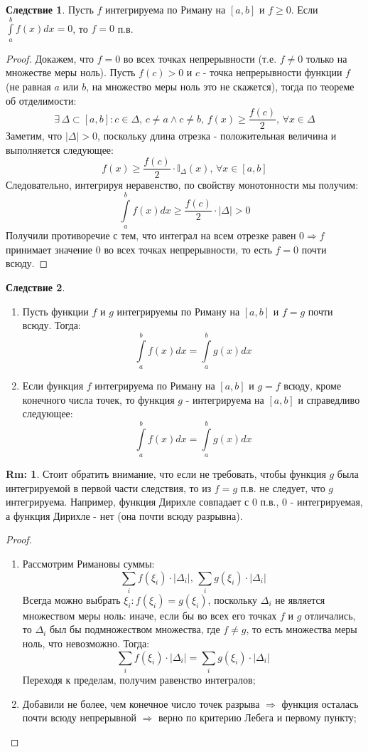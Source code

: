\documentclass[12pt]{article}
\theoremstyle{definition}
\newtheorem{rem}{Rm:}
\newtheorem{corollary}{Следствие}
\newcommand{\ddint}[2]{\displaystyle\int\limits_{#1}^{#2}}
\begin{document}
\begin{corollary}
	Пусть $f$ интегрируема по Риману на $[a,b]$ и $f \geq 0$. Если $\ddint{a}{b}f(x)dx = 0$, то $f =0$ п.в.
\end{corollary}
\begin{proof}
	Докажем, что $f = 0$ во всех точках непрерывности (т.е. $f \neq 0$ только на множестве меры ноль). Пусть $f(c) > 0$ и $c$ - точка непрерывности функции $f$ (не равная $a$ или $b$, на множество меры ноль это не скажется), тогда по теореме об отделимости:
	$$
		\exists \, \Delta \subset [a,b] \colon c \in \Delta,\, c \neq a \wedge c \neq b, \, f(x) \geq \dfrac{f(c)}{2}, \, \forall x \in \Delta
	$$
	Заметим, что $|\Delta| > 0$, поскольку длина отрезка - положительная величина и выполняется следующее:
	$$
		f(x) \geq \dfrac{f(c)}{2}{\cdot}\mathbb{I}_\Delta(x), \, \forall x \in [a,b]
	$$ 
	Следовательно, интегрируя неравенство, по свойству монотонности мы получим:
	$$
		\ddint{a}{b}f(x)dx \geq \dfrac{f(c)}{2}{\cdot}|\Delta| > 0
	$$
	Получили противоречие с тем, что интеграл на всем отрезке равен $0 \Rightarrow f$ принимает значение $0$ во всех точках непрерывности, то есть $f = 0$ почти всюду.
\end{proof}
\newpage
\begin{corollary}\hfill
	\begin{enumerate}[label={\arabic*)}]
		\item Пусть функции $f$ и $g$ интегрируемы по Риману на $[a,b]$ и $f = g$ почти всюду. Тогда:
		$$
			\ddint{a}{b}f(x)dx = \ddint{a}{b}g(x)dx
		$$
		\item Если функция $f$ интегрируема по Риману на $[a,b]$ и $g = f$ всюду, кроме конечного числа точек, то функция $g$ - интегрируема на $[a,b]$ и справедливо следующее:
		$$
			\ddint{a}{b}f(x)dx = \ddint{a}{b}g(x)dx
		$$
	\end{enumerate}
\end{corollary}
\begin{rem}
	Стоит обратить внимание, что если не требовать, чтобы функция $g$ была интегрируемой в первой части следствия, то из $f = g$ п.в. не следует, что $g$ интегрируема. Например, функция Дирихле совпадает с $0$ п.в., $0$ - интегрируемая, а функция Дирихле - нет (она почти всюду разрывна).
\end{rem}
\begin{proof}\hfill
	\begin{enumerate}[label={\arabic*)}]
		\item Рассмотрим Римановы суммы:
		$$
			\sum\limits_{i}f(\xi_i){\cdot}|\Delta_i|, \, \sum\limits_i g(\xi_i){\cdot}|\Delta_i|
		$$
		Всегда можно выбрать $\xi_i \colon f(\xi_i) = g(\xi_i)$, поскольку $\Delta_i$ не является множеством меры ноль: иначе, если бы во всех его точках $f$ и $g$ отличались, то $\Delta_i$ был бы подмножеством множества, где $f \neq g$, то есть множества меры ноль, что невозможно. Тогда:
		$$
			\sum\limits_{i}f(\xi_i){\cdot}|\Delta_i| = \sum\limits_i g(\xi_i){\cdot}|\Delta_i|
		$$
		Переходя к пределам, получим равенство интегралов;
		\item Добавили не более, чем конечное число точек разрыва $\Rightarrow$ функция осталась почти всюду непрерывной $\Rightarrow$ верно по критерию Лебега и первому пункту;
	\end{enumerate}
\end{proof}
\end{document}
